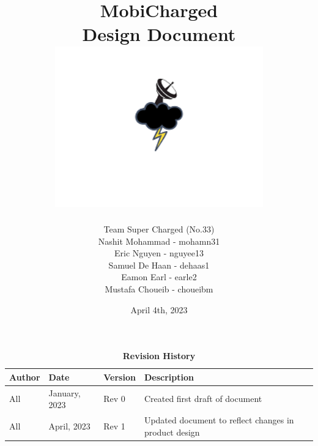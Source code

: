 \documentclass[12pt, titlepage]{article}
\begin{document}
\title{
    MobiCharged\\Design Document 
    \includegraphics[width=9cm]{images/mobicharged.png} 
}
\author{Team Super Charged (No.33)
		\\ Nashit Mohammad - mohamn31
		\\ Eric Nguyen - nguyee13
		\\ Samuel De Haan - dehaas1
		\\ Eamon Earl - earle2
		\\ Mustafa Choueib - choueibm
}
    

\date{April 4th, 2023}


\maketitle

\tableofcontents
\listoffigures
\listoftables

\vspace{20pt}
\begin{center}
\begin{table}[H]
\caption{\bf Revision History}
    \begin{tabular}{p{2cm}p{3cm}p{2cm}p{6cm}}
    \hline
    \bf Author & \bf Date & \bf Version & \bf Description\\
    \hline
    All & January, 2023 & Rev 0 & Created first draft of document\\
    \hline
    All & April, 2023 & Rev 1 & Updated document to reflect changes in product design\\
    \hline
    \end{tabular}
\end{table}
\end{center}

\newpage

\end{document}
